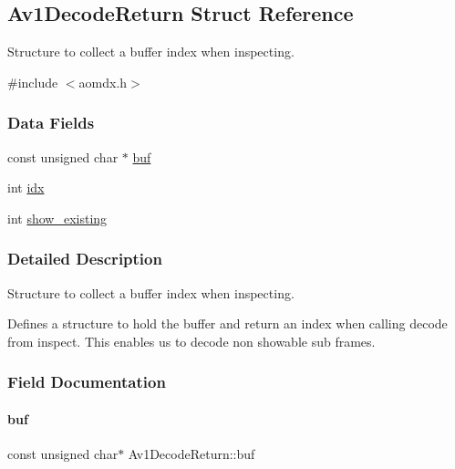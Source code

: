 \hypertarget{structAv1DecodeReturn}{}\subsection{Av1\+Decode\+Return Struct Reference}
\label{structAv1DecodeReturn}


Structure to collect a buffer index when inspecting.  




{\ttfamily \#include $<$aomdx.\+h$>$}

\subsubsection*{Data Fields}
\begin{DoxyCompactItemize}
\item 
const unsigned char $\ast$ \hyperlink{structAv1DecodeReturn_aab2b7d54d778b8d5ef5b475b4460ee9f}{buf}
\item 
int \hyperlink{structAv1DecodeReturn_aeefcb8b1f412902428fa86ea066e4414}{idx}
\item 
int \hyperlink{structAv1DecodeReturn_ac95f1cc492f7bb172dc1d9132674c3ec}{show\+\_\+existing}
\end{DoxyCompactItemize}


\subsubsection{Detailed Description}
Structure to collect a buffer index when inspecting. 

Defines a structure to hold the buffer and return an index when calling decode from inspect. This enables us to decode non showable sub frames. 

\subsubsection{Field Documentation}
\mbox{\label{structAv1DecodeReturn_aab2b7d54d778b8d5ef5b475b4460ee9f}} 
\paragraph{\texorpdfstring{buf}{buf}}
{\footnotesize\ttfamily const unsigned char$\ast$ Av1\+Decode\+Return\+::buf}

